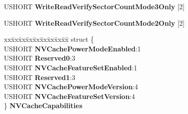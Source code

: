\begin{DoxyCompactItemize}
\begin{tabbing}
\end{tabbing}\item 
\mbox{\label{struct___i_d_e_n_t_i_f_y___d_e_v_i_c_e___d_a_t_a_ae0e4cfaf7b33b73bded3614fb4bc1f07}} 
U\+S\+H\+O\+RT {\bfseries Write\+Read\+Verify\+Sector\+Count\+Mode3\+Only} \mbox{[}2\mbox{]}
\item 
\mbox{\label{struct___i_d_e_n_t_i_f_y___d_e_v_i_c_e___d_a_t_a_a1d1ffbb4330b8c08395d365414061a88}} 
U\+S\+H\+O\+RT {\bfseries Write\+Read\+Verify\+Sector\+Count\+Mode2\+Only} \mbox{[}2\mbox{]}
\item 
\mbox{\label{struct___i_d_e_n_t_i_f_y___d_e_v_i_c_e___d_a_t_a_a37b0ae2f398f442a35ccd2b9fa720a13}} 
\begin{tabbing}
xx\=xx\=xx\=xx\=xx\=xx\=xx\=xx\=xx\=\kill
struct \{\\
\>USHORT {\bfseries NVCachePowerModeEnabled}:1\\
\>USHORT {\bfseries Reserved0}:3\\
\>USHORT {\bfseries NVCacheFeatureSetEnabled}:1\\
\>USHORT {\bfseries Reserved1}:3\\
\>USHORT {\bfseries NVCachePowerModeVersion}:4\\
\>USHORT {\bfseries NVCacheFeatureSetVersion}:4\\
\} {\bfseries NVCacheCapabilities}\\


\end{tabbing}
\end{DoxyCompactItemize}
